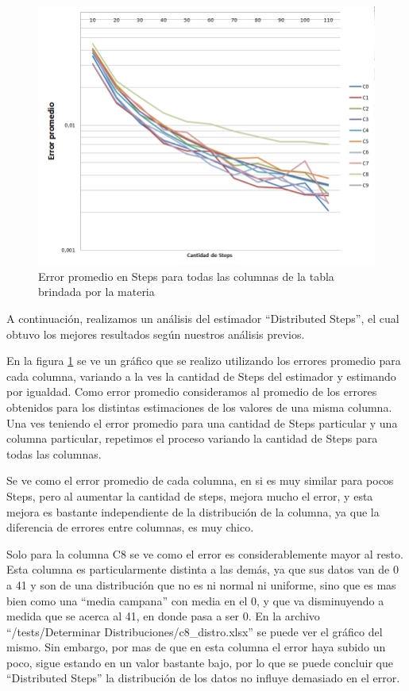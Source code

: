 \begin{figure}[H]
	    \includegraphics[scale=.60]{imagenes/variacion_parametro_y_columna_steps.png}
	    \caption{Error promedio en Steps para todas las columnas de la tabla brindada por la materia} 
	    \label{fig:variacion_parametro_y_columna_steps}
\end{figure}

	A continuaci\'on, realizamos un an\'alisis del estimador ``Distributed Steps'', el cual obtuvo los mejores resultados seg\'un nuestros an\'alisis previos.
	
	En la figura \ref{fig:variacion_parametro_y_columna_steps} se ve un gr\'afico que se realizo utilizando los errores promedio para cada columna, variando a la ves la cantidad de Steps del estimador y estimando por igualdad. Como error promedio consideramos al promedio de los errores obtenidos para los distintas estimaciones de los valores de una misma columna. Una ves teniendo el error promedio para una cantidad de Steps particular y una columna particular, repetimos el proceso variando la cantidad de Steps para todas las columnas.
	
	Se ve como el error promedio de cada columna, en si es muy similar para pocos Steps, pero al aumentar la cantidad de steps, mejora mucho el error, y esta mejora es bastante independiente de la distribuci\'on de la columna, ya que la diferencia de errores entre columnas, es muy chico.

	Solo para la columna C8 se ve como el error es considerablemente mayor al resto. Esta columna es particularmente distinta a las dem\'as, ya que sus datos van de 0 a 41 y son de una distribuci\'on que no es ni normal ni uniforme, sino que es mas bien como una ``media campana'' con media en el 0, y que va disminuyendo a medida que se acerca al 41, en donde pasa a ser 0. En la archivo ``/tests/Determinar Distribuciones/c8\_distro.xlsx'' se puede ver el gr\'afico del mismo. Sin embargo, por mas de que en esta columna el error haya subido un poco, sigue estando en un valor bastante bajo, por lo que se puede concluir que ``Distributed Steps'' la distribuci\'on de los datos no influye demasiado en el error.
	
